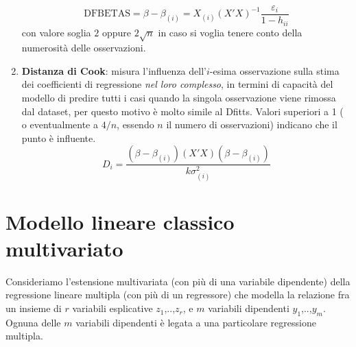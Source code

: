 \documentclass[a4page, 11pt]{article} %
\begin{document}
\begin{enumerate}
\begin{equation*}
\mathrm{DFBETAS} = \beta - \beta_{(i)} = X_{(i)}(X'X)^{-1}\frac{\varepsilon_i}{1-h_{ii}}
\end{equation*}
con valore soglia $2$ oppure $2\sqrt{n}$ in caso si voglia tenere conto della numerosità delle osservazioni.
\item \textbf{Distanza di Cook}: misura l’influenza dell'$i$-esima osservazione sulla stima dei coefficienti di regressione \textit{nel loro complesso}, in termini di capacità del modello di predire tutti i casi quando la singola osservazione viene rimossa dal dataset, per questo motivo è molto simile al Dfitts. Valori superiori a 1 ( o eventualmente a $4/n$, essendo $n$ il numero di osservazioni) indicano che il punto è influente.
\begin{equation*}
D_i = \frac{(\beta - \beta_{(i)})(X'X)(\beta - \beta_{(i)})}{k\sigma_{(i)}^2}
\end{equation*}
\end{enumerate}

\section{Modello lineare classico multivariato}

Consideriamo l’estensione multivariata (con più di una variabile dipendente) della regressione lineare multipla (con più di un regressore) che modella la relazione fra un insieme di $r$ variabili esplicative $z_1$,..,$z_r$, e $m$ variabili dipendenti $y_1$,..,$y_m$. Ognuna delle $m$ variabili dipendenti è legata a una particolare regressione multipla. 
\end{document}
